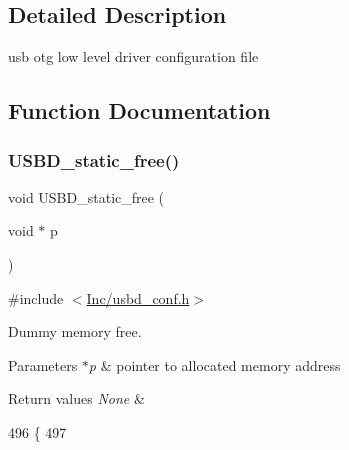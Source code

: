 \subsection{Detailed Description}
usb otg low level driver configuration file 



\subsection{Function Documentation}
\mbox{\label{group___u_s_b_d___c_o_n_f_ga92ed1214efe53f54b3586a6233cfa5a6}} 
\subsubsection{\texorpdfstring{U\+S\+B\+D\+\_\+static\+\_\+free()}{USBD\_static\_free()}}
{\footnotesize\ttfamily void U\+S\+B\+D\+\_\+static\+\_\+free (\begin{DoxyParamCaption}\item[{void $\ast$}]{p }\end{DoxyParamCaption})}



{\ttfamily \#include $<$\mbox{\hyperlink{usbd__conf_8h}{Inc/usbd\+\_\+conf.\+h}}$>$}



Dummy memory free. 


\begin{DoxyParams}{Parameters}
{\em $\ast$p} & pointer to allocated memory address \\
\hline
\end{DoxyParams}

\begin{DoxyRetVals}{Return values}
{\em None} & \\
\hline
\end{DoxyRetVals}

\begin{DoxyCode}
496 \{
497 
\end{DoxyCode}
\mbox{\label{group___u_s_b_d___c_o_n_f_ga2df01b9aae6026e9f6b55da3b1e72aee}} 
